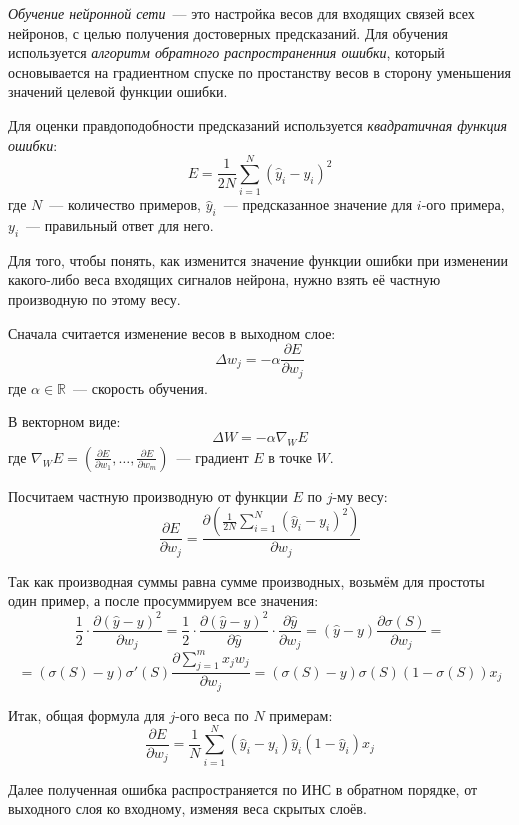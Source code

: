 	\textit{Обучение нейронной сети}~--- это настройка весов для входящих связей всех нейронов, с целью получения достоверных предсказаний.
	Для обучения используется \textit{алгоритм обратного распространенния ошибки}, который основывается на градиентном спуске по простанству
	весов в сторону уменьшения значений целевой функции ошибки.

	Для оценки правдоподобности предсказаний используется \textit{квадратичная функция ошибки}:
	\[
		E = \frac{1}{2N}\sum_{i = 1}^N \left(\hat y_i - y_i\right)^2
	\]
	где $N$~--- количество примеров, $\hat y_i$~--- предсказанное значение для $i$-ого примера, $y_i$~--- правильный ответ для него.

	Для того, чтобы понять, как изменится значение функции ошибки при изменении какого-либо веса входящих сигналов нейрона,
	нужно взять её частную производную по этому весу.

	Сначала считается изменение весов в выходном слое:
	\[
		\Delta w_j = -\alpha\frac{\partial E}{\partial w_j}
	\]
	где $\alpha \in \mathbb R$~--- скорость обучения.

	В векторном виде:
	\[
		\Delta W = -\alpha\nabla_W E
	\]
	где $\nabla_W E = \left(\frac{\partial E}{\partial w_1},\dots,\frac{\partial E}{\partial w_m}\right)$~--- градиент $E$ в точке $W$.

	Посчитаем частную производную от функции $E$ по $j$-му весу:
	\[
		\frac{\partial E}{\partial w_j}	= \frac{\partial\left(\frac{1}{2N}\sum_{i = 1}^N \left(\hat y_i - y_i\right)^2\right)}{\partial w_j}
	\]
	
	Так как производная суммы равна сумме производных, возьмём для простоты один пример, а после просуммируем все значения:
	\[
		\frac{1}{2}\cdot\frac{\partial{\left(\hat y - y\right)^2}}{\partial w_j} =
		\frac{1}{2}\cdot\frac{\partial\left(\hat y - y\right)^2}{\partial\hat y}\cdot\frac{\partial\hat y}{\partial w_j} =
		\left(\hat y - y\right)\frac{\partial\sigma\left(S\right)}{\partial w_j} =
	\]
	\[
		= \left(\sigma\left(S\right) - y\right)\sigma\prime\left(S\right)\frac{\partial\sum_{j = 1}^m x_j w_j}{\partial w_j} =
		\left(\sigma\left(S\right) - y\right)\sigma\left(S\right)\left(1 - \sigma\left(S\right)\right) x_j
	\]

	Итак, общая формула для $j$-ого веса по $N$ примерам:
	\[
		\frac{\partial E}{\partial w_j} = \frac{1}{N}\sum_{i = 1}^N
		\left(\hat y_i - y_i\right)\hat y_i\left(1 - \hat y_i\right) x_j
	\]

	Далее полученная ошибка распространяется по ИНС в обратном порядке, от выходного слоя ко входному, изменяя веса скрытых слоёв.
	
